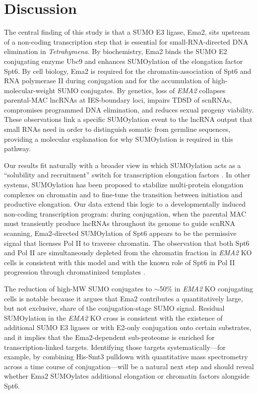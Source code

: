 \documentclass[11pt,a4paper]{article}
\begin{document}
\section{Discussion}

The central finding of this study is that a SUMO E3 ligase, Ema2, sits upstream of a non-coding transcription step that is essential for small-RNA-directed DNA elimination in \textit{Tetrahymena}. By biochemistry, Ema2 binds the SUMO E2 conjugating enzyme Ubc9 and enhances SUMOylation of the elongation factor Spt6. By cell biology, Ema2 is required for the chromatin-association of Spt6 and RNA polymerase II during conjugation and for the accumulation of high-molecular-weight SUMO conjugates. By genetics, loss of \textit{EMA2} collapses parental-MAC lncRNAs at IES-boundary loci, impairs TDSD of scnRNAs, compromises programmed DNA elimination, and reduces sexual progeny viability. These observations link a specific SUMOylation event to the lncRNA output that small RNAs need in order to distinguish somatic from germline sequences, providing a molecular explanation for why SUMOylation is required in this pathway.

Our results fit naturally with a broader view in which SUMOylation acts as a ``solubility and recruitment'' switch for transcription elongation factors \citep{Hendriks2016,Geiss2007}. In other systems, SUMOylation has been proposed to stabilize multi-protein elongation complexes on chromatin and to fine-tune the transition between initiation and productive elongation. Our data extend this logic to a developmentally induced non-coding transcription program: during conjugation, when the parental MAC must transiently produce lncRNAs throughout its genome to guide scnRNA scanning, Ema2-directed SUMOylation of Spt6 appears to be the permissive signal that licenses Pol II to traverse chromatin. The observation that both Spt6 and Pol II are simultaneously depleted from the chromatin fraction in \textit{EMA2} KO cells is consistent with this model and with the known role of Spt6 in Pol II progression through chromatinized templates \citep{Hartzog2013}.

The reduction of high-MW SUMO conjugates to $\sim$50\% in \textit{EMA2} KO conjugating cells is notable because it argues that Ema2 contributes a quantitatively large, but not exclusive, share of the conjugation-stage SUMO signal. Residual SUMOylation in the \textit{EMA2} KO cross is consistent with the existence of additional SUMO E3 ligases or with E2-only conjugation onto certain substrates, and it implies that the Ema2-dependent sub-proteome is enriched for transcription-linked targets. Identifying those targets systematically---for example, by combining His-Smt3 pulldown with quantitative mass spectrometry across a time course of conjugation---will be a natural next step and should reveal whether Ema2 SUMOylates additional elongation or chromatin factors alongside Spt6.
\end{document}
